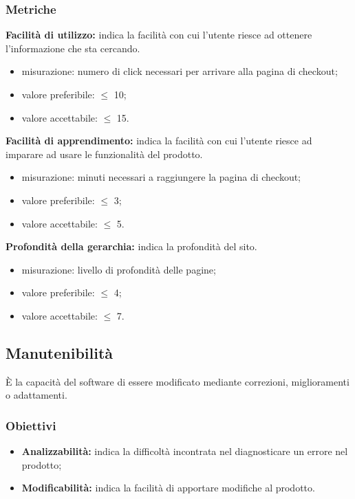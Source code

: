 \subsubsection{Metriche}
\textbf{Facilità di utilizzo:} indica la facilità con cui l'utente riesce ad ottenere l'informazione che sta cercando.
\begin{itemize}
    \item misurazione: numero di click necessari per arrivare alla pagina di checkout;
    \item valore preferibile: $\leq$ 10;
    \item valore accettabile: $\leq$ 15.
\end{itemize}
\textbf{Facilità di apprendimento:} indica la facilità con cui l'utente riesce ad imparare ad usare le funzionalità del prodotto.
\begin{itemize}
    \item misurazione: minuti necessari a raggiungere la pagina di checkout;
    \item valore preferibile: $\leq$ 3;
    \item valore accettabile: $\leq$ 5.
\end{itemize}
\textbf{Profondità della gerarchia:} indica la profondità del sito.
\begin{itemize}
    \item misurazione: livello di profondità delle pagine;
    \item valore preferibile: $\leq$ 4;
    \item valore accettabile: $\leq$ 7.
\end{itemize}
\subsection{Manutenibilità}
È la capacità del software di essere modificato mediante correzioni, miglioramenti o adattamenti.
\subsubsection{Obiettivi}
\begin{itemize}
    \item \textbf{Analizzabilità:} indica la difficoltà incontrata nel diagnosticare un errore nel prodotto;
    \item \textbf{Modificabilità:} indica la facilità di apportare modifiche al prodotto.
\end{itemize}
